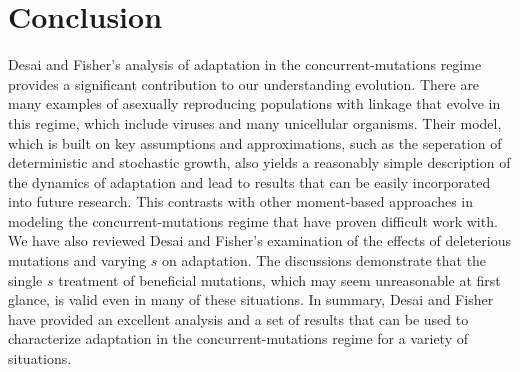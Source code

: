 \documentclass[12pt, one column]{article}
\begin{document}
\section*{Conclusion}
Desai and Fisher's analysis of adaptation in the concurrent-mutations regime provides a significant contribution to our understanding evolution.  There are many examples of asexually reproducing populations with linkage that evolve in this regime, which include viruses and many unicellular organisms.  Their model, which is built on key assumptions and approximations, such as the seperation of deterministic and stochastic growth, also yields a reasonably simple description of the dynamics of adaptation and lead to results that can be easily incorporated into future research.  This contrasts with other moment-based approaches in modeling the concurrent-mutations regime that have proven difficult work with.  We have also reviewed Desai and Fisher's examination of the effects of deleterious mutations and varying $s$ on adaptation.  The discussions demonstrate that the single $s$ treatment of beneficial mutations, which may seem unreasonable at first glance, is valid even in many of these situations.  In summary, Desai and Fisher have provided an excellent analysis and a set of results that can be used to characterize adaptation in the concurrent-mutations regime for a variety of situations.



\end{document}
